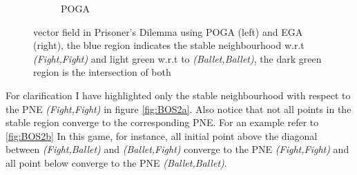 \begin{figure}[H]
\begin{subfigure}{.5\textwidth}
    \caption{POGA}
\end{subfigure}
\caption{vector field in Prisoner’s Dilemma using POGA (left) and EGA (right),
the blue region indicates the stable neighbourhood w.r.t \textit{(Fight,Fight)} and light green w.r.t to \textit{(Ballet,Ballet)}, the dark green region is the intersection of both}
\label{fig:BOS1}
\end{figure}

For clarification I have highlighted only the stable neighbourhood with respect to the PNE \textit{(Fight,Fight)} in figure \ref{fig:BOS2a}. Also notice that not all points in the stable region converge to the corresponding PNE. For an example refer to \ref{fig:BOS2b} In this game, for instance, all initial point above the diagonal between \textit{(Fight,Ballet)} and \textit{(Ballet,Fight)} converge to the PNE \textit{(Fight,Fight)} and all point below converge to the PNE \textit{(Ballet,Ballet)}.


